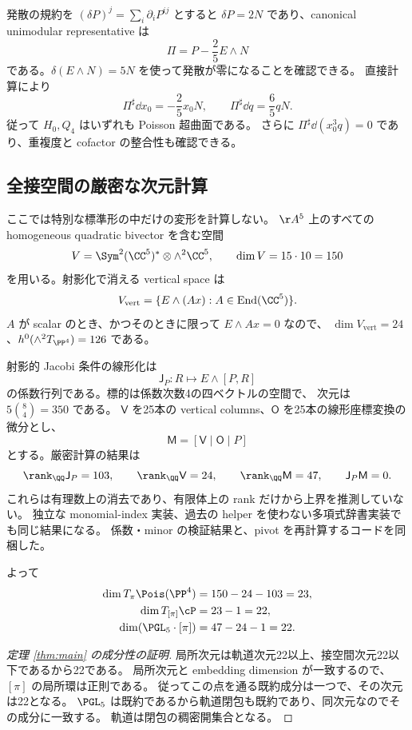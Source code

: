 発散の規約を $(\delta P)^j=\sum_i\partial_iP^{ij}$ とすると
$\delta P=2N$ であり、canonical unimodular representative は
\[
                         \Pi=P-\frac25E\wedge N
\]
である。$\delta(E\wedge N)=5N$ を使って発散が零になることを確認できる。
直接計算により
\begin{equation}\label{eq:cofactors}
 \Pi^\sharp\dd x_0=-\frac25x_0N,\qquad
 \Pi^\sharp\dd q=\frac65qN.
\end{equation}
従って $H_0,Q_4$ はいずれも Poisson 超曲面である。
さらに $\Pi^\sharp\dd(x_0^3q)=0$ であり、重複度と cofactor の整合性も確認できる。

\subsection{全接空間の厳密な次元計算}
ここでは特別な標準形の中だけの変形を計算しない。
$\AA^5$ 上のすべての homogeneous quadratic bivector を含む空間
\[
 V=\Sym^2(\CC^5)^*\otimes\wedge^2\CC^5,\qquad \dim V=15\cdot10=150
\]
を用いる。射影化で消える vertical space は
\[
 V_{\mathrm{vert}}=\{E\wedge(Ax):A\in\operatorname{End}(\CC^5)\}.
\]
$A$ が scalar のとき、かつそのときに限って $E\wedge Ax=0$ なので、
$\dim V_{\mathrm{vert}}=24$、$h^0(\wedge^2T_{\PP^4})=126$ である。

射影的 Jacobi 条件の線形化は
\[
                   \mathsf J_P:R\longmapsto E\wedge[P,R]
\]
の係数行列である。標的は係数次数4の四ベクトルの空間で、
次元は $5\binom84=350$ である。
$\mathsf V$ を25本の vertical columns、$\mathsf O$ を25本の線形座標変換の微分とし、
\[
                   \mathsf M=[\mathsf V\mid\mathsf O\mid P]
\]
とする。厳密計算の結果は
\begin{equation}\label{eq:rankcert}
 \rank_{\QQ}\mathsf J_P=103,\qquad
 \rank_{\QQ}\mathsf V=24,\qquad
 \rank_{\QQ}\mathsf M=47,\qquad \mathsf J_P\mathsf M=0.
\end{equation}
これらは有理数上の消去であり、有限体上の rank だけから上界を推測していない。
独立な monomial-index 実装、過去の helper を使わない多項式辞書実装でも同じ結果になる。
係数・minor の検証結果と、pivot を再計算するコードを同梱した。

よって
\begin{align*}
 \dim T_\pi\Pois(\PP^4)&=150-24-103=23,\\
 \dim T_{[\pi]}\cP&=23-1=22,\\
 \dim(\PGL_5\cdot[\pi])&=47-24-1=22.
\end{align*}

\begin{proof}[定理 \ref{thm:main} の成分性の証明]
局所次元は軌道次元22以上、接空間次元22以下であるから22である。
局所次元と embedding dimension が一致するので、$[\pi]$ の局所環は正則である。
従ってこの点を通る既約成分は一つで、その次元は22となる。
$\PGL_5$ は既約であるから軌道閉包も既約であり、同次元なのでその成分に一致する。
軌道は閉包の稠密開集合となる。
\end{proof}

